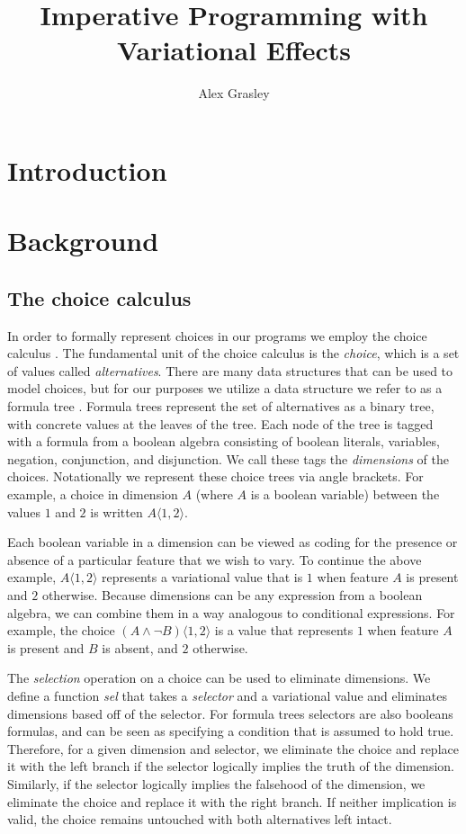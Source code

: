 \documentclass[letterpaper,10pt,onecolumn]{article}
\title{Imperative Programming with Variational Effects}
\author{Alex Grasley}
\newcommand{\tagtree}[3]{#1 \langle #2, #3 \rangle}
\begin{document}
\maketitle

\section{Introduction}


\section{Background}

\subsection{The choice calculus}

In order to formally represent choices in our programs we employ the choice
calculus \cite{ericthesis,erwig2011choice}. The fundamental unit of the choice calculus is
the \emph{choice}, which is a set of values called \emph{alternatives}.
There are many data structures that can be used to model
choices, but for our purposes we utilize a data structure we refer
to as a formula tree \cite{walkingshaw2014projectional,walkingshaw2014variational}.
Formula trees represent the set of alternatives as a binary tree, with concrete
values at the leaves of the tree. Each node of the tree is tagged with a formula from a boolean
algebra consisting of boolean literals, variables, negation, conjunction, and disjunction. We call these
tags the \emph{dimensions} of the choices. Notationally we represent these choice trees
via angle brackets. For example, a choice in dimension $A$ (where $A$ is a boolean variable)
between the values $1$ and $2$ is written $\tagtree{A}{1}{2}$.

Each boolean variable in a dimension can be viewed as coding for the presence or absence of a
particular feature that we wish to vary. To continue the above example, $\tagtree{A}{1}{2}$
represents a variational value that is $1$ when feature $A$ is present and $2$ otherwise. Because
dimensions can be any expression from a boolean algebra, we can combine them in a way
analogous to conditional expressions. For example, the choice $\tagtree{(A \wedge \neg B)}{1}{2}$
is a value that represents $1$ when feature $A$ is present and $B$ is absent, and $2$ otherwise.

The \emph{selection} operation on a choice can be used to eliminate dimensions. We define a function
\emph{sel} that takes a \emph{selector} and a variational value and eliminates dimensions based off
of the selector. For formula trees selectors are also booleans formulas, and can be seen as specifying
a condition that is assumed to hold true. Therefore, for a given dimension and
selector, we eliminate the choice and replace it with the left branch if the selector logically implies
the truth of the dimension. Similarly, if the selector logically implies the falsehood of the dimension, we eliminate the choice
and replace it with the right branch. If neither implication is valid, the choice remains untouched with
both alternatives left intact.
\end{document}

